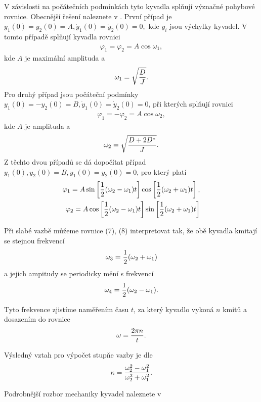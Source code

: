 \documentclass[a4paper,12pt]{article}
\begin{document}
V závislosti na počátečních podmínkách tyto kyvadla splňují význačné pohybové rovnice. Obecnější řešení naleznete v \cite{1}. První případ je $y_1(0)=y_2(0)=A, \dot y_1(0)=\dot y_2(0)=0,$ kde $y_i$ jsou výchylky kyvadel. V tomto případě splňují kyvadla rovnici
\begin{eqnarray}
	\varphi_1=\varphi_2=A\cos \omega_1,
\end{eqnarray}
kde $A$ je maximální amplituda a
\begin{eqnarray}
	\omega_1=\sqrt{{D\over J}}.
\end{eqnarray}
Pro druhý případ jsou počáteční podmínky $y_1(0)=-y_2(0)=B, \dot y_1(0)=\dot y_2(0)=0$, při kterých splňují rovnici
\begin{eqnarray}
	\varphi_1=-\varphi_2=A\cos \omega_2,
\end{eqnarray}
kde $A$ je amplituda a 
\begin{eqnarray}
	\omega_2=\sqrt{{D+2D^* \over J}}.
\end{eqnarray}
Z těchto dvou případů se dá dopočítat případ $y_1(0) ,y_2(0)=B, \dot y_1(0)=\dot y_2(0)=0$, pro který platí
\begin{eqnarray}
	\varphi_1=A\sin\left[{1\over 2}(\omega_2-\omega_1)t\right]\cos\left[{1\over 2}(\omega_2+\omega_1)t\right], \\
	\varphi_2=A\cos\left[{1\over 2}(\omega_2-\omega_1)t\right]\sin\left[{1\over 2}(\omega_2+\omega_1)t\right]
\end{eqnarray}

Při slabé vazbě můžeme rovnice (7), (8) interpretovat tak, že obě kyvadla kmitají se stejnou frekvencí
\begin{eqnarray}
	\omega_3={1 \over 2}(\omega_2+\omega_1)
\end{eqnarray}
a jejich ampitudy se periodicky mění s frekvencí
\begin{eqnarray}
	\omega_4={1 \over 2}(\omega_2-\omega_1).
\end{eqnarray}

Tyto frekvence zjistíme naměřením času $t$, za který kyvadlo vykoná $n$ kmitů a dosazením do rovnice
\begin{eqnarray}
	\omega={2\pi n \over t}.
\end{eqnarray}

Výsledný vztah pro výpočet stupňe vazby je dle \cite{1}
\begin{eqnarray}
	\kappa={\omega_2^2-\omega_1^2 \over \omega_2^2+\omega_1^2}.
\end{eqnarray}

Podrobnější rozbor mechaniky kyvadel naleznete v \cite{2} 
\end{document}
